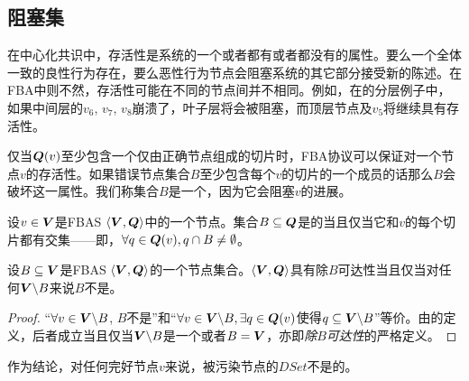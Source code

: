 \subsection{阻塞集}
在中心化共识中，存活性是系统的一个或者都有或者都没有的属性。要么一个全体一致的良性行为{\quorum}存在，要么恶性行为节点会阻塞系统的其它部分接受新的陈述。在FBA中则不然，存活性可能在不同的节点间并不相同。例如，在的分层{\quorum}例子中，如果中间层的$v_6$, $v_7$, $v_8$崩溃了，叶子层将会被阻塞，而顶层节点及$v_5$将继续具有存活性。

仅当${\bm Q}(v)$至少包含一个仅由正确节点组成的{\quorum}切片时，FBA协议可以保证对一个节点$v$的存活性。如果错误节点集合$B$至少包含每个$v$的切片的一个成员的话那么$B$会破坏这一属性。我们称集合$B$是一个{\vblock}，因为它会阻塞$v$的进展。

\begin{definition}[{\vblock}]
        设$v\in {\bm V}$是FBAS $\langle{\bm V},{\bm Q}\rangle$中的一个节点。集合$B\subseteq {\bm Q}$是{\vblock}的当且仅当它和$v$的每个切片都有交集——即，$\forall q\in {\bm Q}(v),q\cap B\neq \emptyset$。
\end{definition}

\begin{theorem}\label{thm:quorum_availability_vs_vblocking}
        设$B\subseteq {\bm V}$是FBAS $\langle{\bm V},{\bm Q}\rangle$的一个节点集合。$\langle{\bm V},{\bm Q}\rangle$具有除$B${\quorum}可达性当且仅当对任何${\bm V}\backslash B$来说$B$不是{\vblock}。
\end{theorem}

\begin{proof}
        ``$\forall v\in {\bm V}\backslash B$, $B$不是{\vblock}''和``$\forall v\in{\bm V}\backslash B, \exists q\in {\bm Q}(v)$使得$q\subseteq {\bm V}\backslash B$''等价。由{\quorum}的定义，后者成立当且仅当${\bm V}\backslash B$是一个{\quorum}或者$B={\bm V}$，亦即\textit{除$B${\quorum}可达性}的严格定义。
\end{proof}

作为结论，对任何完好节点$v$来说，被污染节点的$DSet$不是{\vblock}的。